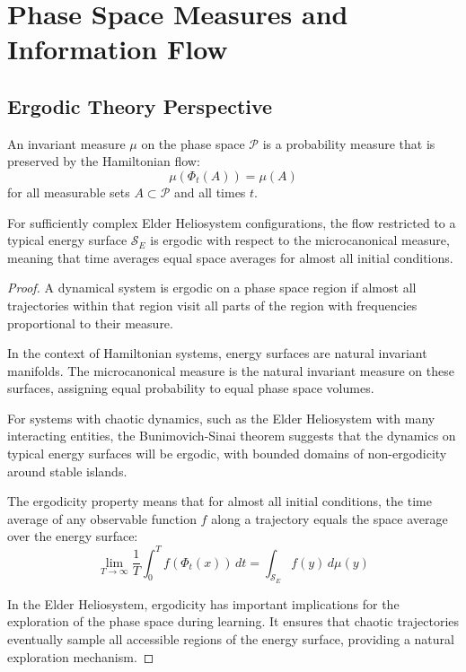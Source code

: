 \section{Phase Space Measures and Information Flow}

\subsection{Ergodic Theory Perspective}

\begin{definition}
An invariant measure $\mu$ on the phase space $\mathcal{P}$ is a probability measure that is preserved by the Hamiltonian flow:
\begin{equation}
\mu(\Phi_t(A)) = \mu(A)
\end{equation}
for all measurable sets $A \subset \mathcal{P}$ and all times $t$.
\end{definition}

\begin{theorem}
For sufficiently complex Elder Heliosystem configurations, the flow restricted to a typical energy surface $\mathcal{S}_E$ is ergodic with respect to the microcanonical measure, meaning that time averages equal space averages for almost all initial conditions.
\end{theorem}

\begin{proof}
A dynamical system is ergodic on a phase space region if almost all trajectories within that region visit all parts of the region with frequencies proportional to their measure.

In the context of Hamiltonian systems, energy surfaces are natural invariant manifolds. The microcanonical measure is the natural invariant measure on these surfaces, assigning equal probability to equal phase space volumes.

For systems with chaotic dynamics, such as the Elder Heliosystem with many interacting entities, the Bunimovich-Sinai theorem suggests that the dynamics on typical energy surfaces will be ergodic, with bounded domains of non-ergodicity around stable islands.

The ergodicity property means that for almost all initial conditions, the time average of any observable function $f$ along a trajectory equals the space average over the energy surface:
\begin{equation}
\lim_{T \to \infty} \frac{1}{T} \int_0^T f(\Phi_t(x)) \, dt = \int_{\mathcal{S}_E} f(y) \, d\mu(y)
\end{equation}

In the Elder Heliosystem, ergodicity has important implications for the exploration of the phase space during learning. It ensures that chaotic trajectories eventually sample all accessible regions of the energy surface, providing a natural exploration mechanism.
\end{proof}

